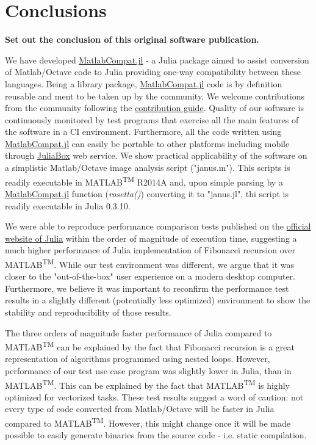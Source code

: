 \section{Conclusions}

\textbf{Set out the conclusion of this original software publication.}

We have developed \href{https://github.com/MatlabCompat/MatlabCompat.jl}{MatlabCompat.jl} - a Julia package aimed to assist conversion of Matlab/Octave code to Julia providing one-way compatibility between these languages. Being a library package, \href{https://github.com/MatlabCompat/MatlabCompat.jl}{MatlabCompat.jl} code is by definition reusable and ment to be taken up by the community. We welcome contributions from the community following the \href{http://matlabcompat.github.io/contribute.html}{contribution guide}. Quality of our software is continuously monitored by test programs that exercise all the main features of the software in a CI environment. Furthermore, all the code written using \href{https://github.com/MatlabCompat/MatlabCompat.jl}{MatlabCompat.jl} can easily be portable to other platforms including mobile through \href{https://www.juliabox.org/}{JuliaBox} web service. We show practical applicability of the software on a simplistic Matlab/Octave image analysis script ("janus.m"). This scripts is readily executable in MATLAB\textsuperscript{TM} R2014A and, upon simple parsing by a \href{https://github.com/MatlabCompat/MatlabCompat.jl}{MatlabCompat.jl} function (\textit{rosetta()}) converting it to "janus.jl", thi script is readily executable in Julia 0.3.10.

We were able to reproduce performance comparison tests published on the \href{http://julialang.org/benchmarks/}{official website of Julia} within the order of magnitude of execution time, suggesting a much higher performance of Julia implementation of Fibonacci recursion over MATLAB\textsuperscript{TM}. While our test environment was different, we argue that it was closer to the "out-of-the-box" user experience on a modern desktop computer. Furthermore, we believe it was important to reconfirm the performance test results in a slightly different (potentially less optimized) environment to show the stability and reproducibility of those results.

The three orders of magnitude faster performance of Julia compared to MATLAB\textsuperscript{TM} can be explained by the fact that Fibonacci recursion is a great representation of algorithms programmed using nested loops. However, performance of our test use case program was slightly lower in Julia, than in MATLAB\textsuperscript{TM}. This can be explained by the fact that MATLAB\textsuperscript{TM} is highly optimized for vectorized tasks. These test results suggest a word of caution: not every type of code converted from Matlab/Octave will be faster in Julia compared to MATLAB\textsuperscript{TM}. However, this might change once it will be made possible to easily generate binaries from the source code - i.e. static compilation.

